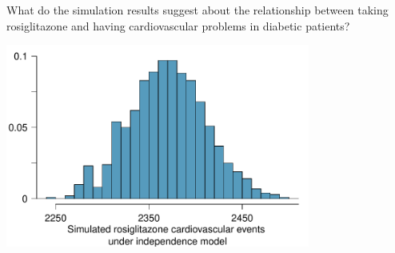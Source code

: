 {\begin{parts}
\begin{subparts}
\item What do the simulation results suggest about the relationship between taking rosiglitazone and having cardiovascular problems in diabetic patients?
\end{subparts}
\begin{center}
\includegraphics[width = 0.75\textwidth]{01/figures/eoce/avandia/avandia_RandHist} \\
\end{center}
\end{parts}
}{}


\textB{\pagebreak}

